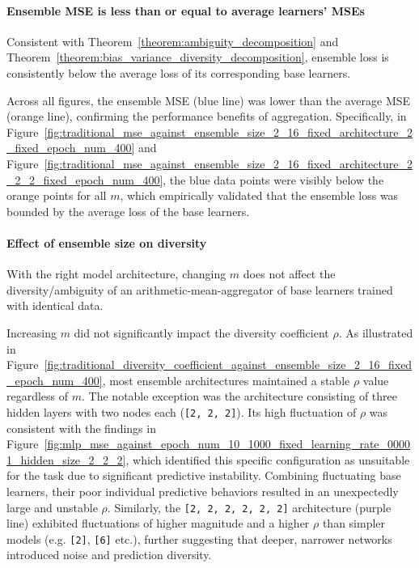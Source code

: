 \paragraph{Ensemble MSE is less than or equal to average learners' MSEs}
Consistent with Theorem~\ref{theorem:ambiguity_decomposition} and Theorem~\ref{theorem:bias_variance_diversity_decomposition}, ensemble loss is consistently below the average loss of its corresponding base learners. 

Across all figures, the ensemble MSE (blue line) was lower than the average MSE (orange line), confirming the performance benefits of aggregation. Specifically, in Figure~\ref{fig:traditional_mse_against_ensemble_size_2_16_fixed_architecture_2_fixed_epoch_num_400} and Figure~\ref{fig:traditional_mse_against_ensemble_size_2_16_fixed_architecture_2_2_2_fixed_epoch_num_400}, the blue data points were visibly below the orange points for all $m$, which empirically validated that the ensemble loss was bounded by the average loss of the base learners. 

\paragraph{Effect of ensemble size on diversity}
With the right model architecture, changing $m$ does not affect the diversity/ambiguity of an arithmetic-mean-aggregator of base learners trained with identical data. 

Increasing $m$ did not significantly impact the diversity coefficient $\rho$. As illustrated in Figure~\ref{fig:traditional_diversity_coefficient_against_ensemble_size_2_16_fixed_epoch_num_400}, most ensemble architectures maintained a stable $\rho$ value regardless of $m$. The notable exception was the architecture consisting of three hidden layers with two nodes each (\texttt{[2, 2, 2]}). Its high fluctuation of $\rho$ was consistent with the findings in Figure~\ref{fig:mlp_mse_against_epoch_num_10_1000_fixed_learning_rate_00001_hidden_size_2_2_2}, which identified this specific configuration as unsuitable for the task due to significant predictive instability. Combining fluctuating base learners, their poor individual predictive behaviors resulted in an unexpectedly large and unstable $\rho$. Similarly, the \texttt{[2, 2, 2, 2, 2, 2]} architecture (purple line) exhibited fluctuations of higher magnitude and a higher $\rho$ than simpler models (e.g. \texttt{[2]}, \texttt{[6]} etc.), further suggesting that deeper, narrower networks introduced noise and prediction diversity. 

